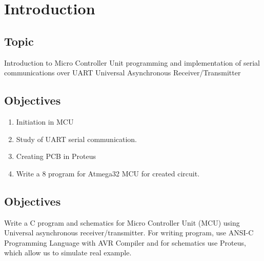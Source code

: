 \section*{\center Introduction}


\subsection*{Topic}
Introduction to Micro Controller Unit programming and implementation of serial communications over UART Universal Asynchronous Receiver/Transmitter


\subsection*{Objectives}
\begin{enumerate}
	\item Initiation in MCU
    \item Study of UART serial communication.
    \item Creating PCB in Proteus
    \item Write a 8 program for Atmega32 MCU for created circuit.
\end{enumerate}


\subsection*{Objectives}
Write  a C program and schematics for Micro Controller Unit (MCU) using Universal asynchronous receiver/transmitter. For writing program, use ANSI-C Programming Language with AVR Compiler and for schematics use Proteus, which allow us to simulate real example.

